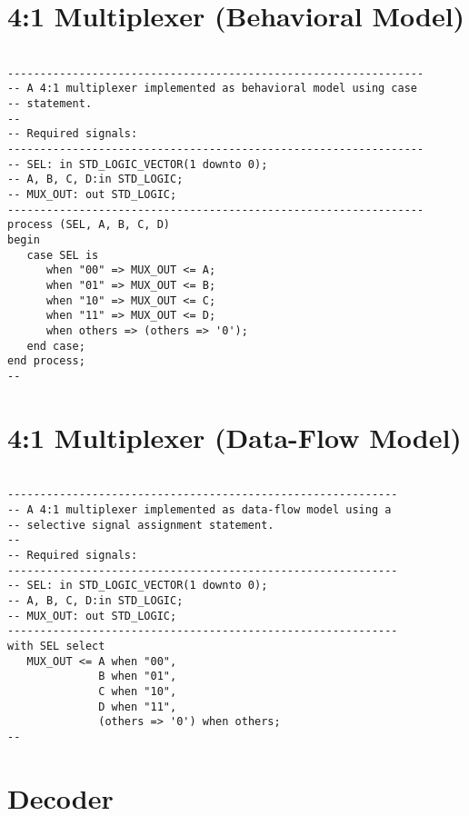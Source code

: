 \section{4:1 Multiplexer (Behavioral Model)}

\noindent
\begin{minipage}{0.99\linewidth}
\begin{lstlisting}

----------------------------------------------------------------
-- A 4:1 multiplexer implemented as behavioral model using case
-- statement. 
--
-- Required signals: 
----------------------------------------------------------------
-- SEL: in STD_LOGIC_VECTOR(1 downto 0);
-- A, B, C, D:in STD_LOGIC;
-- MUX_OUT: out STD_LOGIC;
----------------------------------------------------------------
process (SEL, A, B, C, D)
begin
   case SEL is
      when "00" => MUX_OUT <= A;
      when "01" => MUX_OUT <= B;
      when "10" => MUX_OUT <= C;
      when "11" => MUX_OUT <= D;
      when others => (others => '0');
   end case;
end process;
--
\end{lstlisting}
\end{minipage}

\section{4:1 Multiplexer (Data-Flow Model)}

\noindent
\begin{minipage}{0.99\linewidth}
\begin{lstlisting}

------------------------------------------------------------
-- A 4:1 multiplexer implemented as data-flow model using a
-- selective signal assignment statement. 
--
-- Required signals: 
------------------------------------------------------------
-- SEL: in STD_LOGIC_VECTOR(1 downto 0);
-- A, B, C, D:in STD_LOGIC;
-- MUX_OUT: out STD_LOGIC;
------------------------------------------------------------
with SEL select
   MUX_OUT <= A when "00", 
              B when "01", 
              C when "10", 
              D when "11", 
              (others => '0') when others;
--
\end{lstlisting}
\end{minipage}

\section{Decoder}

